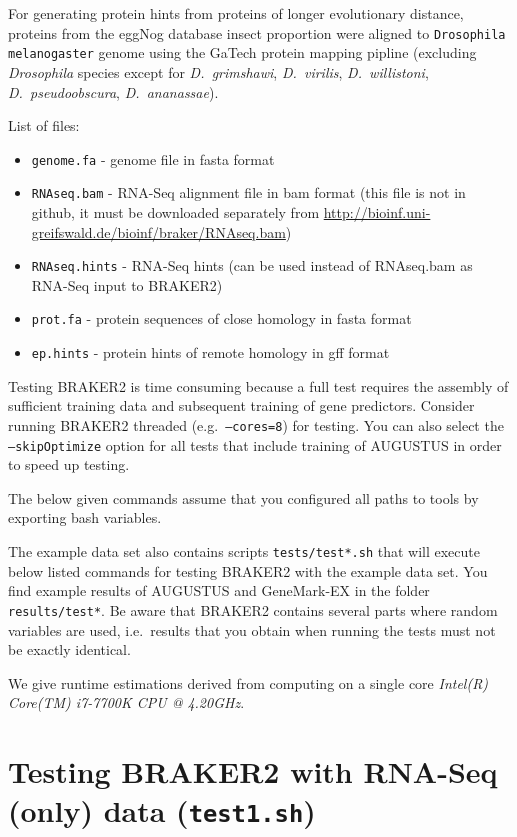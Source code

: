 \documentclass[a4paper,10pt]{report}
\begin{document}
For generating protein hints from proteins of longer evolutionary distance, proteins from the eggNog database insect proportion were aligned to \texttt{Drosophila melanogaster} genome using the GaTech protein mapping pipline (excluding \textit{Drosophila} species except for \textit{D.~grimshawi},
\textit{D.~virilis}, \textit{D.~willistoni}, \textit{D.~pseudoobscura}, \textit{D.~ananassae}).

List of files:

\begin{itemize}
 \item \texttt{genome.fa} - genome file in fasta format
 \item \texttt{RNAseq.bam} - RNA-Seq alignment file in bam format (this file is not in github, it must be downloaded separately from \url{http://bioinf.uni-greifswald.de/bioinf/braker/RNAseq.bam})
 \item \texttt{RNAseq.hints} - RNA-Seq hints (can be used instead of RNAseq.bam as RNA-Seq input to BRAKER2)
 \item \texttt{prot.fa} - protein sequences of close homology in fasta format
 \item \texttt{ep.hints} - protein hints of remote homology in gff format
\end{itemize}


Testing BRAKER2 is time consuming because a full test requires the assembly of sufficient training data and subsequent training of gene predictors. Consider running BRAKER2 threaded (e.g.~\texttt{--cores=8}) for testing. You can also select the \texttt{--skipOptimize} option for all tests that include training of AUGUSTUS in order to speed up testing. 

The below given commands assume that you configured all paths to tools by exporting bash variables.

The example data set also contains scripts \texttt{tests/test*.sh} that will execute below listed commands for testing BRAKER2 with the example data set. You find example results of AUGUSTUS and GeneMark-EX in the folder \texttt{results/test*}. Be aware that BRAKER2 contains several parts where random variables are used, i.e.~results that you obtain when running the tests must not be exactly identical.

We give runtime estimations derived from computing on a single core \textit{Intel(R) Core(TM) i7-7700K CPU @ 4.20GHz}.

\section{Testing BRAKER2 with RNA-Seq (only) data (\texttt{test1.sh})}
\end{document}
